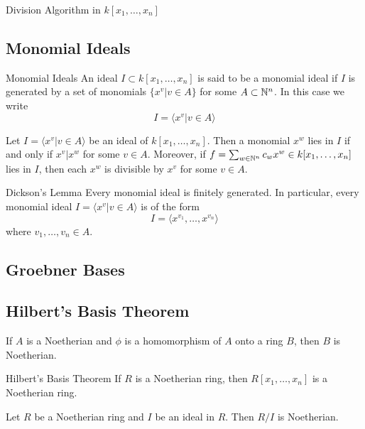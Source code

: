 \documentclass[a4paper]{article}
\begin{document}
\begin{prp}{Division Algorithm in $k[x_1,\dots,x_n]$}{}
\end{prp}

\subsection{Monomial Ideals}
\begin{defn}{Monomial Ideals}{} An ideal $I\subset k[x_1,\dots,x_n]$ is said to be a monomial ideal if $I$ is generated by a set of monomials $\{x^v|v\in A\}$ for some $A\subset\mathbb{N}^n$. In this case we write $$I=\langle x^v|v\in A\rangle$$
\end{defn}

\begin{lmm}{}{} Let $I=\langle x^v|v\in A\rangle$ be an ideal of $k[x_1,\dots,x_n]$. Then a monomial $x^w$ lies in $I$ if and only if $x^v|x^w$ for some $v\in A$. Moreover, if $f=\sum_{w\in\mathbb{N}^n}c_wx^w\in k[x_1,\dots,x_n]$ lies in $I$, then each $x^w$ is divisible by $x^v$ for some $v\in A$. 
\end{lmm}

\begin{thm}{Dickson's Lemma}{} Every monomial ideal is finitely generated. In particular, every monomial ideal $I=\langle x^v|v\in A\rangle$ is of the form $$I=\langle x^{v_1},\dots,x^{v_n}\rangle$$ where $v_1,\dots,v_n\in A$. 
\end{thm}

\subsection{Groebner Bases}

\subsection{Hilbert's Basis Theorem}
\begin{prp}{}{} If $A$ is a Noetherian and $\phi$ is a homomorphism of $A$ onto a ring $B$, then $B$ is Noetherian. 
\end{prp}

\begin{thm}{Hilbert's Basis Theorem}{} If $R$ is a Noetherian ring, then $R[x_1,\dots,x_n]$ is a Noetherian ring. 
\end{thm}

\begin{prp}{}{} Let $R$ be a Noetherian ring and $I$ be an ideal in $R$. Then $R/I$ is Noetherian. 
\end{prp}
\end{document}
